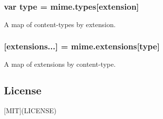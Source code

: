 \subsubsection*{var type = mime.\+types\mbox{[}extension\mbox{]}}

A map of content-\/types by extension.

\subsubsection*{\mbox{[}extensions...\mbox{]} = mime.\+extensions\mbox{[}type\mbox{]}}

A map of extensions by content-\/type.

\subsection*{License}

\mbox{[}M\+IT\mbox{]}(L\+I\+C\+E\+N\+SE) 